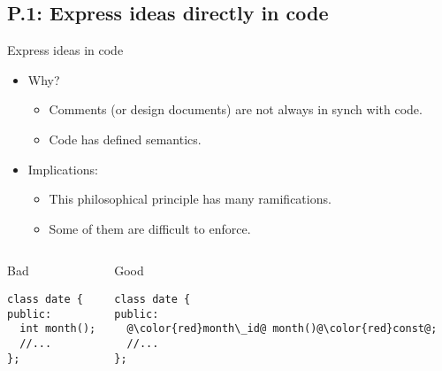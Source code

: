 \subsection{P.1: Express ideas directly in code}

\begin{frame}[t,fragile]{Express ideas in code}
\begin{itemize}
  \item Why?
    \begin{itemize}
      \item Comments (or design documents) are not always in synch with code.
      \item Code has defined semantics.
    \end{itemize}

  \item Implications:
    \begin{itemize}
      \item This philosophical principle has many ramifications.
      \item Some of them are difficult to enforce.
    \end{itemize}
\end{itemize}

\begin{columns}

\begin{block}{Bad}
\begin{lstlisting}
class date {
public:
  int month();
  //...
};
\end{lstlisting}
\end{block}

\pause
{}
\begin{block}{Good}
\begin{lstlisting}[escapechar=@]
class date {
public:
  @\color{red}month\_id@ month()@\color{red}const@;
  //...
};
\end{lstlisting}
\end{block}

\end{columns}

\end{frame}

